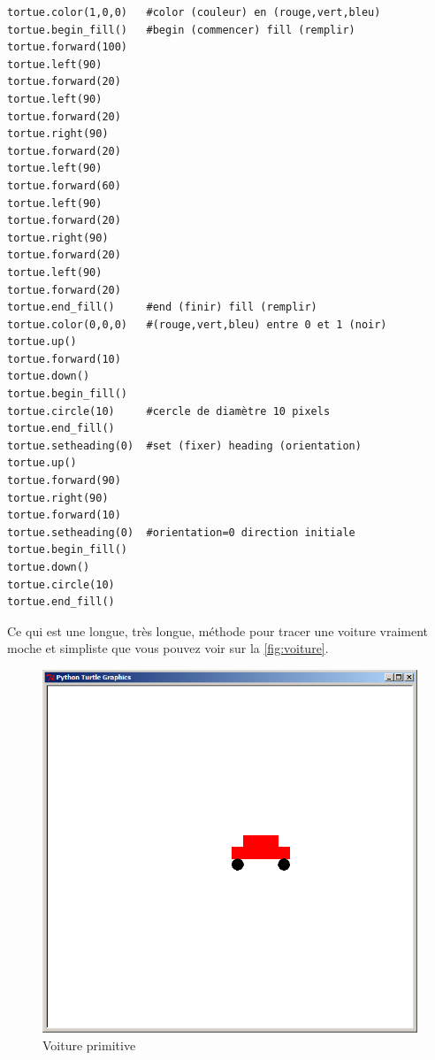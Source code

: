 \begin{Verbatim}[frame=single,rulecolor=\color{mbleu}, label=à copier-coller depuis le fichier du livre]
tortue.color(1,0,0)   #color (couleur) en (rouge,vert,bleu)
tortue.begin_fill()   #begin (commencer) fill (remplir)
tortue.forward(100)
tortue.left(90)
tortue.forward(20)
tortue.left(90)
tortue.forward(20)
tortue.right(90)
tortue.forward(20)
tortue.left(90)
tortue.forward(60)
tortue.left(90)
tortue.forward(20)
tortue.right(90)
tortue.forward(20)
tortue.left(90)
tortue.forward(20)
tortue.end_fill()     #end (finir) fill (remplir)
tortue.color(0,0,0)   #(rouge,vert,bleu) entre 0 et 1 (noir)
tortue.up()
tortue.forward(10)
tortue.down()
tortue.begin_fill()
tortue.circle(10)     #cercle de diamètre 10 pixels
tortue.end_fill()
tortue.setheading(0)  #set (fixer) heading (orientation)
tortue.up()
tortue.forward(90)
tortue.right(90)
tortue.forward(10)
tortue.setheading(0)  #orientation=0 direction initiale
tortue.begin_fill()
tortue.down()
tortue.circle(10)
tortue.end_fill()
\end{Verbatim}

Ce qui est une longue, très longue, méthode pour tracer une voiture vraiment moche et simpliste que vous pouvez voir sur la \autoref{fig:voiture}.

\begin{figure}[h!]
\centering
\includegraphics[scale=0.4]{images/voiture}
\caption{Voiture primitive}\label{fig:voiture}
\end{figure}

